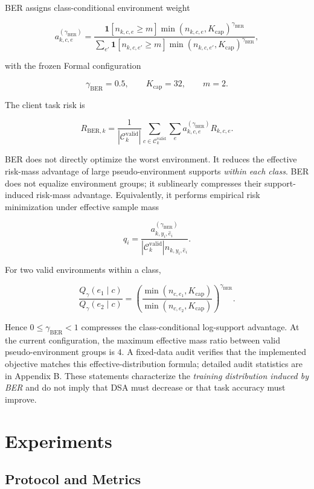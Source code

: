 \documentclass[10pt,twocolumn]{article}
\begin{document}
BER assigns class-conditional environment weight

\[
a^{(\gamma_{\mathrm{BER}})}_{k,c,e}
=
\frac{
\mathbf 1[n_{k,c,e}\ge m]
\min(n_{k,c,e},K_{\mathrm{cap}})^{\gamma_{\mathrm{BER}}}
}{
\sum_{e'}
\mathbf 1[n_{k,c,e'}\ge m]
\min(n_{k,c,e'},K_{\mathrm{cap}})^{\gamma_{\mathrm{BER}}}
},
\]

with the frozen Formal configuration

\[
\gamma_{\mathrm{BER}}=0.5,\qquad K_{\mathrm{cap}}=32,\qquad m=2.
\]

The client task risk is

\[
R_{\mathrm{BER},k}
=
\frac1{|\mathcal C_k^{\mathrm{valid}}|}
\sum_{c\in\mathcal C_k^{\mathrm{valid}}}
\sum_e a^{(\gamma_{\mathrm{BER}})}_{k,c,e}R_{k,c,e}.
\]

BER does not directly optimize the worst environment. It reduces the effective risk-mass advantage of large pseudo-environment supports \emph{within each class}. BER does not equalize environment groups; it sublinearly compresses their support-induced risk-mass advantage. Equivalently, it performs empirical risk minimization under effective sample mass

\[
q_i=
\frac{a^{(\gamma_{\mathrm{BER}})}_{k,y_i,\hat e_i}}
{|\mathcal C_k^{\mathrm{valid}}|n_{k,y_i,\hat e_i}}.
\]

For two valid environments within a class,

\[
\frac{Q_\gamma(e_1\mid c)}{Q_\gamma(e_2\mid c)}
=
\left(
\frac{\min(n_{c,e_1},K_{\mathrm{cap}})}
{\min(n_{c,e_2},K_{\mathrm{cap}})}
\right)^{\gamma_{\mathrm{BER}}}.
\]

Hence \(0\le\gamma_{\mathrm{BER}}<1\) compresses the class-conditional log-support advantage. At the current configuration, the maximum effective mass ratio between valid pseudo-environment groups is \(4\). A fixed-data audit verifies that the implemented objective matches this effective-distribution formula; detailed audit statistics are in Appendix B. These statements characterize the \emph{training distribution induced by BER} and do not imply that DSA must decrease or that task accuracy must improve.

\section{Experiments}

\subsection{Protocol and Metrics}
\end{document}
